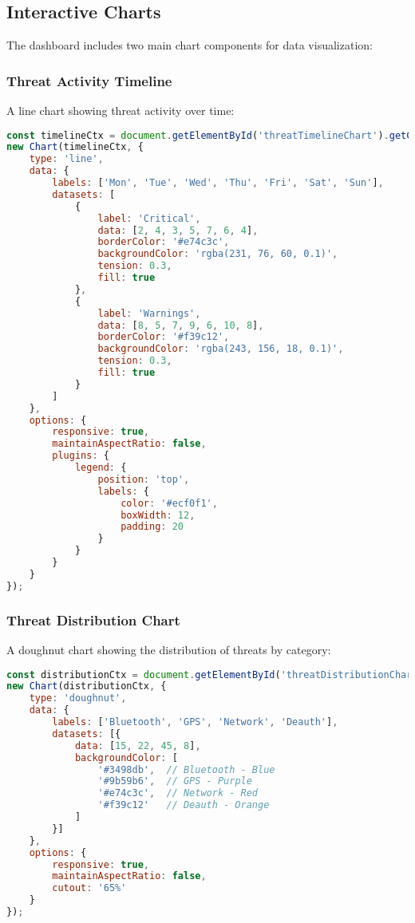 \documentclass[12pt,a4paper]{report}
\begin{document}
\subsection{Interactive Charts}

The dashboard includes two main chart components for data visualization:

\subsubsection{Threat Activity Timeline}
A line chart showing threat activity over time:

\begin{lstlisting}[language=JavaScript, caption=Threat Timeline Chart Configuration]
const timelineCtx = document.getElementById('threatTimelineChart').getContext('2d');
new Chart(timelineCtx, {
    type: 'line',
    data: {
        labels: ['Mon', 'Tue', 'Wed', 'Thu', 'Fri', 'Sat', 'Sun'],
        datasets: [
            {
                label: 'Critical',
                data: [2, 4, 3, 5, 7, 6, 4],
                borderColor: '#e74c3c',
                backgroundColor: 'rgba(231, 76, 60, 0.1)',
                tension: 0.3,
                fill: true
            },
            {
                label: 'Warnings',
                data: [8, 5, 7, 9, 6, 10, 8],
                borderColor: '#f39c12',
                backgroundColor: 'rgba(243, 156, 18, 0.1)',
                tension: 0.3,
                fill: true
            }
        ]
    },
    options: {
        responsive: true,
        maintainAspectRatio: false,
        plugins: {
            legend: {
                position: 'top',
                labels: {
                    color: '#ecf0f1',
                    boxWidth: 12,
                    padding: 20
                }
            }
        }
    }
});
\end{lstlisting}

\subsubsection{Threat Distribution Chart}
A doughnut chart showing the distribution of threats by category:

\begin{lstlisting}[language=JavaScript, caption=Threat Distribution Chart]
const distributionCtx = document.getElementById('threatDistributionChart').getContext('2d');
new Chart(distributionCtx, {
    type: 'doughnut',
    data: {
        labels: ['Bluetooth', 'GPS', 'Network', 'Deauth'],
        datasets: [{
            data: [15, 22, 45, 8],
            backgroundColor: [
                '#3498db',  // Bluetooth - Blue
                '#9b59b6',  // GPS - Purple  
                '#e74c3c',  // Network - Red
                '#f39c12'   // Deauth - Orange
            ]
        }]
    },
    options: {
        responsive: true,
        maintainAspectRatio: false,
        cutout: '65%'
    }
});
\end{lstlisting}
\end{document}
